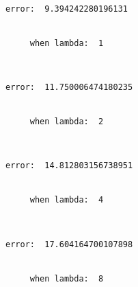 \documentclass[11pt]{article}
\begin{document}
    \begin{Verbatim}[commandchars=\\\{\}]
     error:  9.394242280196131


     when lambda:  1

    \end{Verbatim}

    \begin{center}
    \end{center}
    { \hspace*{\fill} \\}
    
    \begin{Verbatim}[commandchars=\\\{\}]
     error:  11.750006474180235


     when lambda:  2

    \end{Verbatim}

    \begin{center}
    \end{center}
    { \hspace*{\fill} \\}
    
    \begin{Verbatim}[commandchars=\\\{\}]
     error:  14.812803156738951


     when lambda:  4

    \end{Verbatim}

    \begin{center}
    \end{center}
    { \hspace*{\fill} \\}
    
    \begin{Verbatim}[commandchars=\\\{\}]
     error:  17.604164700107898


     when lambda:  8

    \end{Verbatim}

    \begin{center}
    \end{center}
    { \hspace*{\fill} \\}
    
\end{document}
